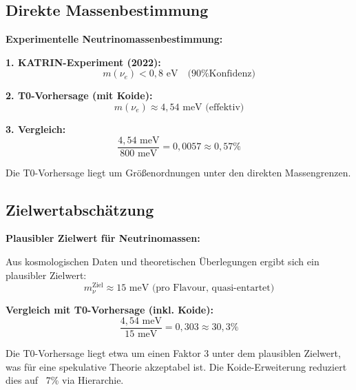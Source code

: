 	\subsection{Direkte Massenbestimmung}
	
	\begin{experimental}
		\textbf{Experimentelle Neutrinomassenbestimmung:}
		
		\textbf{1. KATRIN-Experiment (2022):}
		\begin{equation}
			m(\nu_e) < 0,8 \text{ eV} \quad \text{(90\% Konfidenz)}
		\end{equation}
		
		\textbf{2. T0-Vorhersage (mit Koide):}
		\begin{equation}
			m(\nu_e) \approx 4,54 \text{ meV (effektiv)}
		\end{equation}
		
		\textbf{3. Vergleich:}
		\begin{equation}
			\frac{4,54 \text{ meV}}{800 \text{ meV}} = 0,0057 \approx 0,57\%
		\end{equation}
		
		Die T0-Vorhersage liegt um Größenordnungen unter den direkten Massengrenzen.
	\end{experimental}
	
	\subsection{Zielwertabschätzung}
	
	\begin{keyresult}
		\textbf{Plausibler Zielwert für Neutrinomassen:}
		
		Aus kosmologischen Daten und theoretischen Überlegungen ergibt sich ein plausibler Zielwert:
		\begin{equation}
			m_\nu^{\text{Ziel}} \approx 15 \text{ meV (pro Flavour, quasi-entartet)}
		\end{equation}
		
		\textbf{Vergleich mit T0-Vorhersage (inkl. Koide):}
		\begin{equation}
			\frac{4,54 \text{ meV}}{15 \text{ meV}} = 0,303 \approx 30,3\%
		\end{equation}
		
		Die T0-Vorhersage liegt etwa um einen Faktor 3 unter dem plausiblen Zielwert, was für eine spekulative Theorie akzeptabel ist. Die Koide-Erweiterung reduziert dies auf ~7\% via Hierarchie.
	\end{keyresult}
	
